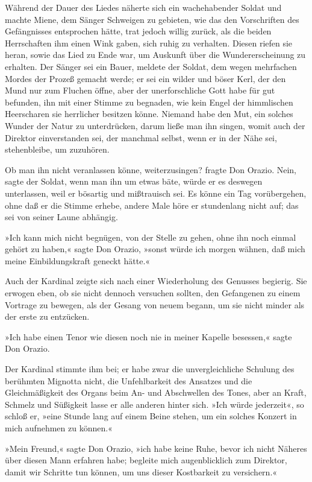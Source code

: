 \pagenum{[66]} Während der Dauer des Liedes näherte sich ein
wachehabender Soldat und machte Miene, dem Sänger Schweigen zu
gebieten, wie das den Vorschriften des Gefängnisses entsprochen
hätte, trat jedoch willig zurück, als die beiden Herrschaften ihm
einen Wink gaben, sich ruhig zu verhalten. Diesen riefen sie heran,
sowie das Lied zu Ende war, um Auskunft über die Wundererscheinung
zu erhalten. Der Sänger sei ein Bauer, meldete der Soldat, dem
wegen mehrfachen Mordes der Prozeß gemacht werde; er sei ein wilder
und böser Kerl, der den Mund nur zum Fluchen öffne, aber der
unerforschliche Gott habe für gut befunden, ihn mit einer Stimme zu
begnaden, wie kein Engel der himmlischen Heerscharen sie herrlicher
besitzen könne. Niemand habe den Mut, ein solches Wunder der Natur
zu unterdrücken, darum ließe man ihn singen, womit auch der
Direktor einverstanden sei, der manchmal selbst, wenn er in der
Nähe sei, stehenbleibe, um zuzuhören.

Ob man ihn nicht veranlassen könne, weiterzusingen? fragte Don
Orazio. Nein, sagte der Soldat, wenn man ihn um etwas bäte, würde
er es deswegen unterlassen, weil er bösartig und mißtrauisch sei.
Es könne ein Tag vorübergehen, ohne daß er die Stimme erhebe,
andere Male höre er stundenlang nicht auf; das sei von seiner Laune
abhängig.

»Ich kann mich nicht begnügen, von der Stelle zu gehen, ohne ihn
noch einmal gehört zu haben,« sagte Don Orazio, »sonst würde ich
morgen wähnen, daß mich meine Einbildungskraft geneckt hätte.«

Auch der Kardinal zeigte sich nach einer Wiederholung des Genusses
begierig. Sie erwogen eben, ob sie nicht dennoch versuchen sollten,
den Gefangenen zu einem Vortrage zu bewegen, als der Gesang von
neuem begann, um sie nicht minder als der erste zu entzücken.

\pagenum{[67]} »Ich habe einen Tenor wie diesen noch nie in meiner
Kapelle besessen,« sagte Don Orazio.

Der Kardinal stimmte ihm bei; er habe zwar die unvergleichliche
Schulung des berühmten Mignotta nicht, die Unfehlbarkeit des
Ansatzes und die Gleichmäßigkeit des Organs beim An- und
Abschwellen des Tones, aber an Kraft, Schmelz und Süßigkeit lasse
er alle anderen hinter sich. »Ich würde jederzeit«, so schloß er,
»eine Stunde lang auf einem Beine stehen, um ein solches Konzert in
mich aufnehmen zu können.«

»Mein Freund,« sagte Don Orazio, »ich habe keine Ruhe, bevor ich
nicht Näheres über diesen Mann erfahren habe; begleite mich
augenblicklich zum Direktor, damit wir Schritte tun können, um uns
dieser Kostbarkeit zu versichern.«

